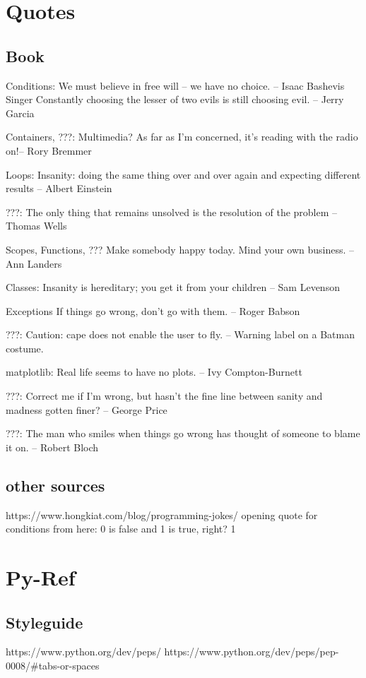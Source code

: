 \chapter{Quotes}
\section{Book}
Conditions:
We must believe in free will -- we have no choice. -- Isaac Bashevis Singer
Constantly choosing the lesser of two evils is still choosing evil. -- Jerry Garcia

Containers, ???:
Multimedia? As far as I'm concerned, it's reading with the radio on!-- Rory Bremmer

Loops:
Insanity: doing the same thing over and over again and expecting different results -- Albert Einstein

???:
The only thing that remains unsolved is the resolution of the problem -- Thomas Wells

Scopes, Functions, ???
Make somebody happy today. Mind your own business. -- Ann Landers

Classes:
Insanity is hereditary; you get it from your children -- Sam Levenson

Exceptions
If things go wrong, don't go with them. -- Roger Babson

???:
Caution: cape does not enable the user to fly. -- Warning label on a Batman costume.

matplotlib:
Real life seems to have no plots. -- Ivy Compton-Burnett

???:
Correct me if I'm wrong, but hasn't the fine line between sanity and madness gotten finer? -- George Price

???:
The man who smiles when things go wrong has thought of someone to blame it on. -- Robert Bloch

\section{other sources}
https://www.hongkiat.com/blog/programming-jokes/
opening quote for conditions from here:
	0 is false and 1 is true, right?
	1

\chapter{Py-Ref}
\section{Styleguide}
https://www.python.org/dev/peps/
https://www.python.org/dev/peps/pep-0008/#tabs-or-spaces

